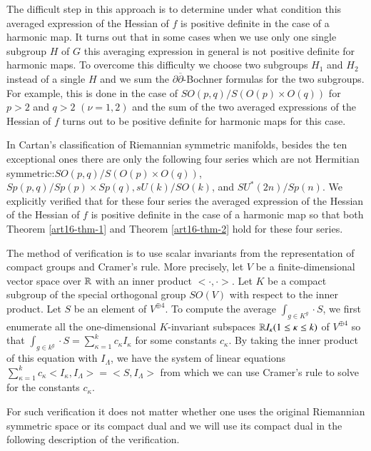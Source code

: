 The difficult step in this approach is to determine under what condition this averaged expression of the Hessian of $f$ is positive definite in the case of a harmonic map. It turns out that in some cases when we use only one single subgroup $H$ of $G$ this averaging expression in general is not positive definite for harmonic maps. To overcome this difficulty we choose two subgroups $H_{1}$ and $H_{2}$ instead of a single $H$ and we sum the $\partial\overline{\partial}$-Bochner formulas for the two subgroups. For example, this is done in the case of $SO(p,q)/S(O(p) \times O(q))$ for $p > 2$ and $q>2$ $(\nu =1, 2)$ and the sum of the two averaged expressions of the Hessian of $f$ turns out to be positive definite for harmonic maps for this case.

In Cartan's classification of Riemannian symmetric manifolds, besides the ten exceptional ones there are only the following four series which are not Hermitian symmetric:$ SO(p,q)/S(O(p)\times O(q))$,\break $Sp(p,q)/Sp(p)\times Sp(q), sU(k)/SO(k)$, and $SU^{*}(2n)/Sp(n)$. We explicitly verified that for these four series the averaged expression of the Hessian of the Hessian of $f$ is positive definite in the case of a harmonic map so that both Theorem \ref{art16-thm-1} and Theorem \ref{art16-thm-2} hold for these four series.  

The method of verification is to use scalar invariants from the representation of compact groups and Cramer's rule. More precisely, let $V$ be a finite-dimensional vector space over $\mathbb{R}$ with an inner product $<\cdot, \cdot>$. Let $K$ be a compact subgroup of the special orthogonal group $SO(V)$ with respect to the inner product. Let $S$ be an element of $V^{\oplus 4}$. To compute the average $\int_{g \in K^{g}} \cdot S$, we first enumerate all the one-dimensional $K$-invariant subspaces $\mathbb{R} I_{\kappa} (1 \leq \kappa \leq k)$ of $V^{\oplus 4}$ so that $\int_{g \in k^{g}}\cdot S= \sum_{\kappa=1}^{k} c_{\kappa}I_{\kappa}$ for some constants $c_{\kappa}$. By taking the inner product of this equation with $I_{\Lambda}$, we have the system of linear equations $\sum_{\kappa=1}^{k} c_{\kappa}< I_{\kappa},I_{\Lambda}> =<S, I_{\Lambda}>$ from which we can use Cramer's rule to solve for the constants $c_{\kappa}$. 

For such verification it does not matter whether one uses the original Riemannian symmetric space or its compact dual and we will use its compact dual in the following description of the verification.

